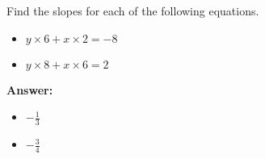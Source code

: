  Find the slopes for each of the following equations. \begin{itemize}\item \( y \times 6 + x \times 2 = -8 \)\item \( y \times 8 + x \times 6 = 2 \)\end{itemize}

        \textbf{Answer:} \begin{itemize}\item \( -\frac{1}{3} \)\item \( -\frac{3}{4} \)\end{itemize}
